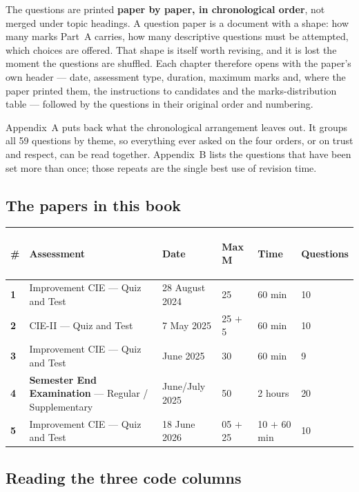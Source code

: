 \documentclass[11pt,a4paper,oneside]{book}
\newcommand{\hdr}[1]{{\sffamily\bfseries\color{white}\strut #1}}
\newcommand{\qn}[1]{{\sffamily\bfseries\color{ocre}#1}}
\begin{document}
\vspace{2pt}
The questions are printed \textbf{paper by paper, in chronological order},
not merged under topic headings. A question paper is a document with a shape:
how many marks Part~A carries, how many descriptive questions must be
attempted, which choices are offered. That shape is itself worth revising, and
it is lost the moment the questions are shuffled. Each chapter therefore opens
with the paper's own header --- date, assessment type, duration, maximum
marks and, where the paper printed them, the instructions to candidates and
the marks-distribution table --- followed by the questions in their original
order and numbering.

\vspace{2pt}
Appendix~A puts back what the chronological arrangement leaves out. It groups
all 59 questions by theme, so everything ever asked on the four orders, or on
trust and respect, can be read together. Appendix~B lists the questions that
have been set more than once; those repeats are the single best use of
revision time.

\subsection*{The papers in this book}

\renewcommand{\arraystretch}{1.35}
\begin{tabular}{@{}C{9mm} P{44mm} P{30mm} C{18mm} C{20mm} C{17mm}@{}}
\hdr{\#} & \hdr{Assessment} & \hdr{Date} & \hdr{Max M} & \hdr{Time} &
\hdr{Questions} \\ \hline
\qn{1} & Improvement CIE --- Quiz and Test & 28 August 2024 & 25 & 60 min &
  10 \\ \hline
\qn{2} & CIE-II --- Quiz and Test & 7 May 2025 & 25 $+$ 5 & 60 min &
  10 \\ \hline
\qn{3} & Improvement CIE --- Quiz and Test & June 2025 & 30 & 60 min &
  9 \\ \hline
\qn{4} & \textbf{Semester End Examination} --- Regular / Supplementary &
  June/July 2025 & 50 & 2 hours & 20 \\ \hline
\qn{5} & Improvement CIE --- Quiz and Test & 18 June 2026 & 05 $+$ 25 &
  10 $+$ 60 min & 10 \\ \hline
\end{tabular}

\subsection*{Reading the three code columns}
\end{document}
